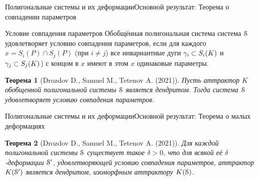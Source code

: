 \documentclass[aspectratio=1610, 10pt, notheorems]{beamer}
\newtheorem{theorem}     {Теорема}
\newtheorem{definition}  {Определение}
\begin{document}
\begin{frame}{Полигональные системы и их деформации}{Основной результат: Теорема о совпадении параметров}


\begin{block}{Условие совпадения параметров}
Обобщённая полигональная система система ${\EuScript S}$ удовлетворяет условию совпадения параметров, если для каждого $x=S_i(P)\cap S_j(P)$ (при $i\neq j$) все инвариантные дуги $\gamma_i\subset S_i(K)$ и $\gamma_j\subset S_j(K)$) с концом в $x$ имеют в этом $x$ одинаковые параметры.
\end{block}
\begin{theorem}[Drozdov D., Samuel M., Tetenov A. (2021)]
Пусть аттрактор $K$ обобщенной полигональной системы ${\EuScript S}$ является дендритом. 
Тогда система ${\EuScript S}$ удовлетворяет условию совпадения параметров.
\end{theorem}
\end{frame}


\begin{frame}{Полигональные системы и их деформации}{Основной результат: Теорема о малых деформациях}
\begin{theorem}[Drozdov D., Samuel M., Tetenov A. (2021)]
Для каждой полигональной системы ${\EuScript S}$ существует такое $\delta > 0$, что для всякой её $\delta$-деформации ${\EuScript S}'$, удовлетворяющей условию совпадения параметров, аттрактор $K({\EuScript S}')$ является дендритом, изоморфным аттрактору $K({\EuScript S})$.
\end{theorem}
\end{frame}
\end{document}
